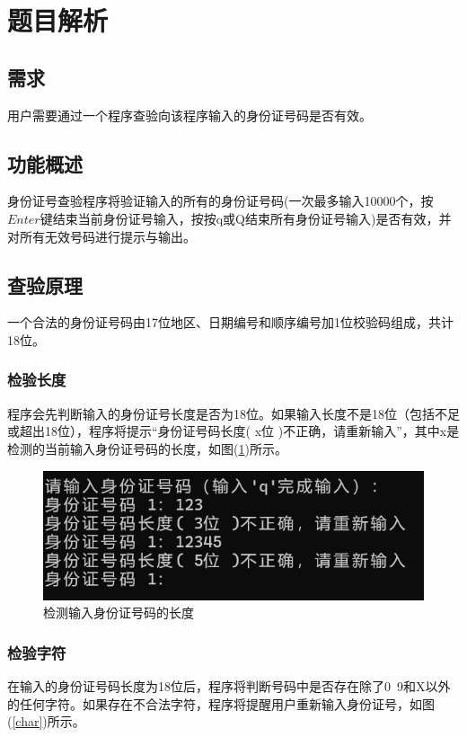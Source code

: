 \documentclass[withoutpreface,bwprint]{cumcmthesis}  %
\title{\heiti{\zihao{3}身份证号码查验程序设计文档}}
\begin{document}
	
	\tableofcontents
	\maketitle
	
	
	\section{题目解析}%
	\subsection{需求}
	用户需要通过一个程序查验向该程序输入的身份证号码是否有效。
	\subsection{功能概述} 
	身份证号查验程序将验证输入的所有的身份证号码(一次最多输入10000个，按$Enter$键结束当前身份证号输入，按按q或Q结束所有身份证号输入)是否有效，并对所有无效号码进行提示与输出。
	
	\subsection{查验原理}
	一个合法的身份证号码由17位地区、日期编号和顺序编号加1位校验码组成，共计18位。
	\subsubsection{检验长度}
	程序会先判断输入的身份证号长度是否为18位。如果输入长度不是18位（包括不足或超出18位），程序将提示“身份证号码长度( x位 )不正确，请重新输入”，其中x是检测的当前输入身份证号码的长度，如图(\ref{long})所示。
	
	\begin{figure}[ht]
		\centering
		\includegraphics[width=.8\textwidth]{检验长度.png}
		\caption{检测输入身份证号码的长度}
		\label{long}
	\end{figure}
	
	\subsubsection{检验字符}
	在输入的身份证号码长度为18位后，程序将判断号码中是否存在除了0~9和X以外的任何字符。如果存在不合法字符，程序将提醒用户重新输入身份证号，如图(\ref{char})所示。
	
\end{document}
